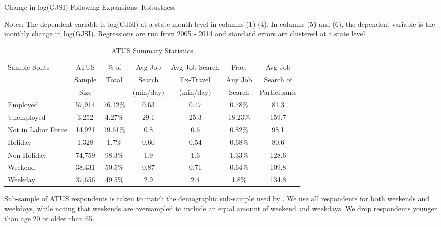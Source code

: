 \documentclass[12pt]{article}
\begin{document}
\begin{spacing}{2}
\begin{appendix}
\begin{table}
\caption{Change in log(GJSI) Following Expansions: Robustness \label{tab:robustexpansion}}
\begin{threeparttable}
\begin{center}

\begin{tablenotes}
\item Notes: The dependent variable is log(GJSI) at a state-month level in columns (1)-(4). In columns (5) and (6), the dependent variable is the monthly change in log(GJSI). Regressions are run from 2005 - 2014 and standard errors are clustered at a state level.
\end{tablenotes}
\end{center}
\end{threeparttable}
\end{table}


\begin{sidewaystable}[!htpb]
\caption{ATUS Summary Statistics}
\label{tab:atussumm}
\centering
\begin{threeparttable}
\begin{tabular}{lcccccc}
\hline
 Sample Splits&ATUS         & \% of  & Avg Job     & Avg Job Search  & Frac. & Avg Job   \\
  & Sample      & Total  & Search      &   Ex-Travel     & Any Job & Search of   \\
 &  Size       &        & (min/day)   &   (min/day)     &   Search   &  Participants  \\
\hline
Employed &57,914   & 76.12\%  & 0.63  & 0.47 & 0.78\%  & 81.3  \\
Unemployed &3,252   &  4.27\% & 29.1 &  25.3 & 18.23\% & 159.7  \\
Not in Labor Force & 14,921  & 19.61\%   & 0.8  & 0.6 & 0.82\%  & 98.1 \\
\hline
Holiday& 1,328& 1.7\% & 0.60 & 0.54 & 0.68\% & 80.6 \\
Non-Holiday& 74,759& 98.3\% & 1.9 & 1.6 & 1.33\% & 128.6 \\
\hline
Weekend&38,431& 50.5\% & 0.87 & 0.71 & 0.64\% & 109.8 \\
Weekday& 37,656& 49.5\% & 2.9 & 2.4 & 1.8\% & 134.8 \\
\hline
\end{tabular}
\begin{tablenotes}
\item  Sub-sample of ATUS respondents is taken to match the demographic sub-sample used by \citet{Krueger2010}. We use all respondents for both weekends and weekdays, while noting that weekends are oversampled to include an equal amount of weekend and weekdays. We drop respondents younger than age 20 or older than 65.
\end{tablenotes}
\end{threeparttable}
\end{sidewaystable}


\end{appendix}

\end{spacing}
\end{document}
